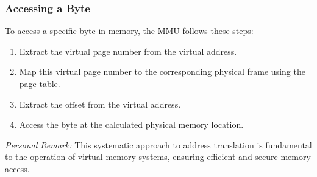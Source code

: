 \documentclass[../../compsys.tex]{subfiles}
\begin{document}
\vspace{40px}
\subsubsection{Accessing a Byte}
To access a specific byte in memory, the MMU follows these steps:
\begin{enumerate}
  \item Extract the virtual page number from the virtual address.
  \item Map this virtual page number to the corresponding physical frame using the page table.
  \item Extract the offset from the virtual address.
  \item Access the byte at the calculated physical memory location.
\end{enumerate}

\textit{Personal Remark:} This systematic approach to address translation is fundamental to the operation of virtual memory systems, ensuring efficient and secure memory access.

\newpage
\end{document}
